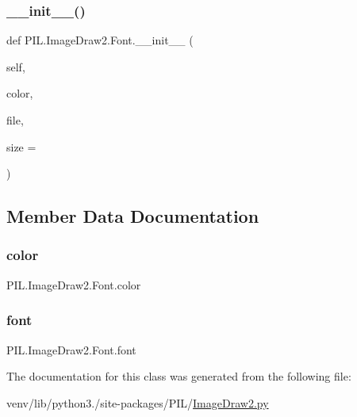 \subsubsection{\texorpdfstring{\+\_\+\+\_\+init\+\_\+\+\_\+()}{\_\_init\_\_()}}
{\footnotesize\ttfamily def P\+I\+L.\+Image\+Draw2.\+Font.\+\_\+\+\_\+init\+\_\+\+\_\+ (\begin{DoxyParamCaption}\item[{}]{self,  }\item[{}]{color,  }\item[{}]{file,  }\item[{}]{size = {} }\end{DoxyParamCaption})}



\subsection{Member Data Documentation}
\mbox{\label{classPIL_1_1ImageDraw2_1_1Font_acdbd092533937bd189a92c943edd74a2}} 
\subsubsection{\texorpdfstring{color}{color}}
{\footnotesize\ttfamily P\+I\+L.\+Image\+Draw2.\+Font.\+color}

\mbox{\label{classPIL_1_1ImageDraw2_1_1Font_a754051f09dc98d8a4e859e233da5849d}} 
\subsubsection{\texorpdfstring{font}{font}}
{\footnotesize\ttfamily P\+I\+L.\+Image\+Draw2.\+Font.\+font}



The documentation for this class was generated from the following file\+:\begin{DoxyCompactItemize}
\item 
venv/lib/python3./site-\/packages/\+P\+I\+L/\hyperlink{ImageDraw2_8py}{Image\+Draw2.\+py}\end{DoxyCompactItemize}
